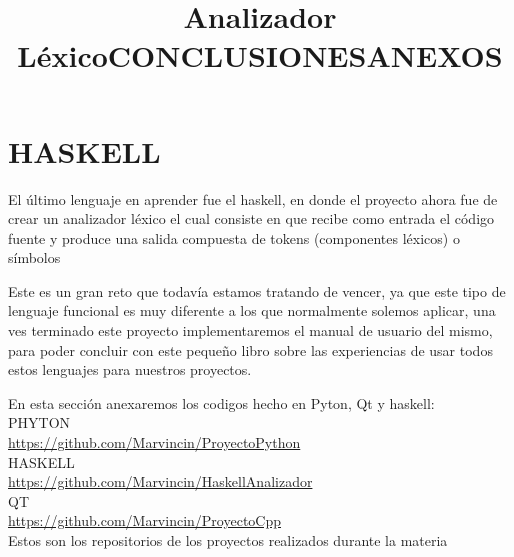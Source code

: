 \documentclass[12pt]{extbook}
\begin{document}
\chapter{HASKELL}
\begin{center}
\title{\Large{Analizador Léxico}}\maketitle
\end{center}
El último lenguaje en aprender fue el haskell, en donde el proyecto ahora fue de crear un analizador léxico el cual consiste en que recibe como entrada el código fuente  y produce una salida compuesta de tokens (componentes léxicos) o símbolos




\begin{center}
\title{CONCLUSIONES}\maketitle
\end{center}

Este es un gran reto que todavía estamos tratando de vencer, ya que
este tipo de lenguaje funcional es muy diferente a los que normalmente
solemos aplicar, una ves terminado este proyecto implementaremos el
manual de usuario del mismo, para poder concluir con este pequeño
libro sobre las experiencias de usar todos estos lenguajes para nuestros
proyectos.


\newpage
\begin{center}
\title{ANEXOS}\maketitle
\end{center}
En esta sección anexaremos los codigos hecho en Pyton, Qt y haskell:\\
PHYTON\\
\href{https://github.com/Marvincin/ProyectoPython}{https://github.com/Marvincin/ProyectoPython}\\
HASKELL\\
\href{https://github.com/Marvincin/Haskell_Analizador}{https://github.com/Marvincin/HaskellAnalizador}\\
QT\\
\href{https://github.com/Marvincin/ProyectoCpp}{https://github.com/Marvincin/ProyectoCpp}\\

Estos son los repositorios de los proyectos realizados durante la materia
\end{document}
